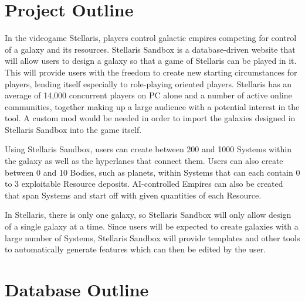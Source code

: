\documentclass[12pt]{article}
\let\Oldsection\section
\renewcommand{\section}{\FloatBarrier\Oldsection}
\begin{document}
\newpage
\section{Project Outline}

In the videogame Stellaris, players control galactic empires competing for control of a galaxy and its resources. Stellaris Sandbox is a database-driven website that will allow users to design a galaxy so that a game of Stellaris can be played in it. This will provide users with the freedom to create new starting circumstances for players, lending itself especially to role-playing oriented players. Stellaris has an average of 14,000 concurrent players on PC alone and a number of active online communities, together making up a large audience with a potential interest in the tool. A custom mod would be needed in order to import the galaxies designed in Stellaris Sandbox into the game itself. 

Using Stellaris Sandbox, users can create between 200 and 1000 Systems within the galaxy as well as the hyperlanes that connect them. Users can also create between 0 and 10 Bodies, such as planets, within Systems that can each contain 0 to 3 exploitable Resource deposits. AI-controlled Empires can also be created that span Systems and start off with given quantities of each Resource.

In Stellaris, there is only one galaxy, so Stellaris Sandbox will only allow design of a single galaxy at a time. Since users will be expected to create galaxies with a large number of Systems, Stellaris Sandbox will provide templates and other tools to automatically generate features which can then be edited by the user.

\newpage
\section{Database Outline}
\end{document}

